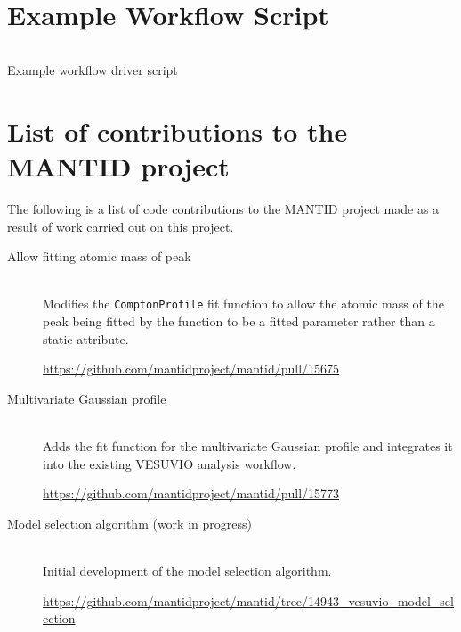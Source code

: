 \documentclass[a4paper]{article}
\begin{document}
\clearpage
\begin{appendices}

\section{Example Workflow Script}
\label{sec:example_workflow_script}

\begin{listing}
  \inputminted[linenos,frame=lines,fontsize=\scriptsize]{python}{listings/workflow_example.py}
  \caption{Example workflow driver script}
  \label{listing:workflow_example}
\end{listing}
\FloatBarrier

\section{List of contributions to the \gls*{MANTID} project}
\label{sec:mantid_contributions}

The following is a list of code contributions to the \gls*{MANTID} project made
as a result of work carried out on this project.

\begin{description}
  \item[Allow fitting atomic mass of peak] \hfill \\
    Modifies the \texttt{ComptonProfile} fit function to allow the atomic mass
    of the peak being fitted by the function to be a fitted parameter rather
    than a static attribute.

    \url{https://github.com/mantidproject/mantid/pull/15675}

  \item[Multivariate Gaussian profile] \hfill \\
    Adds the fit function for the multivariate Gaussian profile and integrates
    it into the existing VESUVIO analysis workflow.

    \url{https://github.com/mantidproject/mantid/pull/15773}

  \item[Model selection algorithm (work in progress)] \hfill \\
    Initial development of the model selection algorithm.

    \url{https://github.com/mantidproject/mantid/tree/14943_vesuvio_model_selection}
\end{description}

\end{appendices}

\printbibliography
\end{document}
